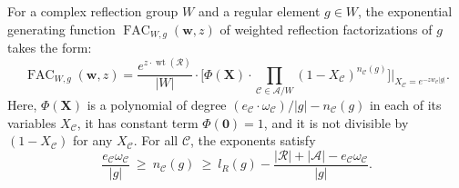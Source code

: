 \documentclass[ALCO, Unicode]{cedram}
\newcommand{\op}[1]{\operatorname{#1}}
\newcommand{\op}[1]{\operatorname{#1}}
\begin{document}
\begin{theo}\label{Thm: Main, weighted}
For a complex reflection group $W$ and a regular element $g\in W$, the exponential generating function $\op{FAC}_{W,g}(\bm w,z)$ of weighted reflection factorizations of $g$ takes the form:$$
\op{FAC}_{W,g}(\bm w,z)=\dfrac{e^{z\cdot\op{wt}(\mathcal{R})}}{|W|}\cdot \Big[ \Phi({\bm X})\cdot\prod_{\mathcal{C}\in\mathcal{A}/W} (1-X_\mathcal{C})^{n^{\phantom{l}}_{\mathcal{C}}(g)}\Big]\Big|_{X_{\mathcal{C}}=e^{-zw_{\mathcal{C}}|g|}}.$$ Here, $\Phi({\bm X})$ is a polynomial of degree $(e_{\mathcal{C}}\cdot \omega_{\mathcal{C}})/|g|-n_{\mathcal{C}}(g)$ in each of its variables $X_{\mathcal{C}}$, it has constant term $\Phi(\bm 0)=1$, and it is not divisible by $(1-X_{\mathcal{C}})$ for any $X_{\mathcal{C}}$. For all $\mathcal{C}$, the exponents satisfy $$\dfrac{e_{\mathcal{C}}\omega_{\mathcal{C}}}{|g|}\ \geq\  n_{\mathcal{C}}(g)\ \geq\  l_R(g)-\dfrac{|\mathcal{R}|+|\mathcal{A}|-e_{\mathcal{C}}\omega_{\mathcal{C}}}{|g|}.$$
\end{theo}
\end{document}
